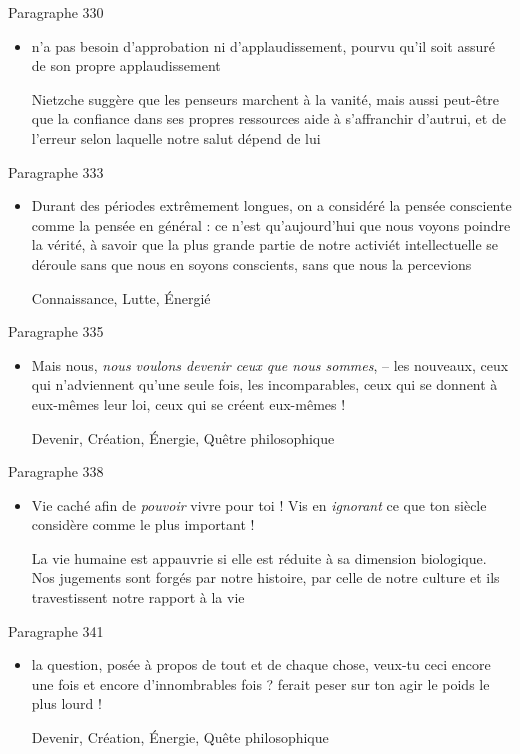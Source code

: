 \documentclass[french,a4paper,11pt,answers]{exam}
\newcommand{\cit}[2]{\og #1 \fg{} \begin{solution}{ #2 }\end{solution}} %
\begin{document}
	\begin{cadre}{Paragraphe 330}
		\begin{itemize}
			\item \cit{[le penseur] n'a pas besoin d'approbation ni d'applaudissement, pourvu qu'il soit assuré de son propre applaudissement}
				{Nietzche suggère que les penseurs marchent à la vanité, mais aussi peut-être que la confiance dans ses propres ressources aide à s'affranchir d'autrui, et de l'erreur selon laquelle notre salut dépend de lui}
		\end{itemize}
	\end{cadre}
	
	\begin{cadre}{Paragraphe 333}
		\begin{itemize}
			\item \cit{Durant des périodes extrêmement longues, on a considéré la pensée consciente comme la pensée en général : ce n'est qu'aujourd'hui que nous voyons poindre la vérité, à savoir que la plus grande partie de notre activiét intellectuelle se déroule sans que nous en soyons conscients, sans que nous la percevions}
				{Connaissance, Lutte, Énergié} %
		\end{itemize}
	\end{cadre}

	\begin{cadre}{Paragraphe 335}
		\begin{itemize}
			\item \cit{Mais nous, \emph{nous voulons devenir ceux que nous sommes}, -- les nouveaux, ceux qui n'adviennent qu'une seule fois, les incomparables, ceux qui se donnent à eux-mêmes leur loi, ceux qui se créent eux-mêmes !}
				{Devenir, Création, Énergie, Quêtre philosophique}
		\end{itemize}
	\end{cadre}

	\begin{cadre}{Paragraphe 338}
		\begin{itemize}
			\item \cit{Vie caché afin de \emph{pouvoir} vivre pour toi ! Vis en \emph{ignorant} ce que ton siècle considère comme le plus important !}
				{La vie humaine est appauvrie si elle est réduite à sa dimension biologique. Nos jugements sont forgés par notre histoire, par celle de notre culture et ils travestissent notre rapport à la vie}
		\end{itemize}
	\end{cadre}
	
	\begin{cadre}{Paragraphe 341}
		\begin{itemize}
			\item \cit{la question, posée à propos de tout et de chaque chose, \og veux-tu ceci encore une fois et encore d'innombrables fois ? \fg{} ferait peser sur ton agir le poids le plus lourd !}
				{Devenir, Création, Énergie, Quête philosophique}
		\end{itemize}
	\end{cadre}
\end{document}
